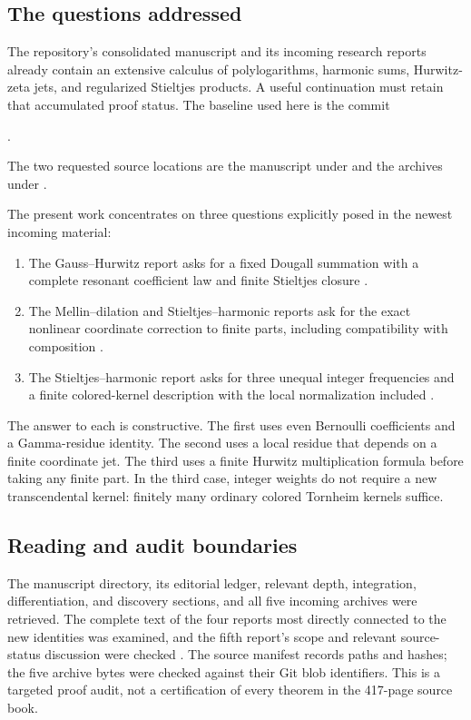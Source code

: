 \subsection{The questions addressed}
The repository's consolidated manuscript and its incoming research reports
already contain an extensive calculus of polylogarithms, harmonic sums,
Hurwitz-zeta jets, and regularized Stieltjes products. A useful continuation
must retain that accumulated proof status. The baseline used here is the
commit
\begin{center}\small\pin.\end{center}
The two requested source locations are the manuscript under
 and the archives under
 \cite{repo}.

The present work concentrates on three questions explicitly posed in the
newest incoming material:
\begin{enumerate}
\item The Gauss--Hurwitz report asks for a fixed Dougall summation with a
complete resonant coefficient law and finite Stieltjes closure
\cite[Section 9, Question 1]{incoming-gh}.
\item The Mellin--dilation and Stieltjes--harmonic reports ask for the exact
nonlinear coordinate correction to finite parts, including compatibility
with composition \cite{incoming-md,incoming-sh}.
\item The Stieltjes--harmonic report asks for three unequal integer
frequencies and a finite colored-kernel description with the local
normalization included \cite[Further research: three unequal integer
frequencies]{incoming-sh}.
\end{enumerate}
The answer to each is constructive. The first uses even Bernoulli
coefficients and a Gamma-residue identity. The second uses a local residue
that depends on a finite coordinate jet. The third uses a finite Hurwitz
multiplication formula before taking any finite part. In the third case,
integer weights do not require a new transcendental kernel: finitely many
ordinary colored Tornheim kernels suffice.

\subsection{Reading and audit boundaries}
The manuscript directory, its editorial ledger, relevant depth,
integration, differentiation, and discovery sections, and all five incoming
archives were retrieved. The complete text of the four reports most
directly connected to the new identities was examined, and the fifth
report's scope and relevant source-status discussion were checked
\cite{incoming-nhj,incoming-continuation}.
The source manifest records paths and hashes; the five archive bytes were
checked against their Git blob identifiers. This is a targeted proof
audit, not a certification of every theorem in the 417-page source book.

